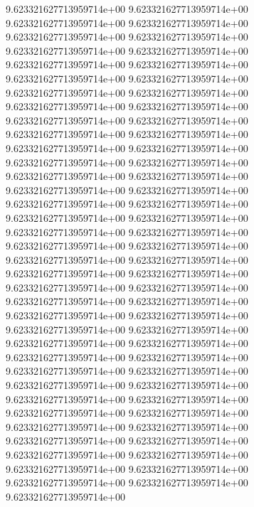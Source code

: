 9.623321627713959714e+00	9.623321627713959714e+00	9.623321627713959714e+00	9.623321627713959714e+00	9.623321627713959714e+00	9.623321627713959714e+00	9.623321627713959714e+00	9.623321627713959714e+00	9.623321627713959714e+00	9.623321627713959714e+00	9.623321627713959714e+00	9.623321627713959714e+00	9.623321627713959714e+00	9.623321627713959714e+00	9.623321627713959714e+00	9.623321627713959714e+00	9.623321627713959714e+00	9.623321627713959714e+00	9.623321627713959714e+00	9.623321627713959714e+00	9.623321627713959714e+00	9.623321627713959714e+00	9.623321627713959714e+00	9.623321627713959714e+00	9.623321627713959714e+00	9.623321627713959714e+00	9.623321627713959714e+00	9.623321627713959714e+00	9.623321627713959714e+00	9.623321627713959714e+00	9.623321627713959714e+00	9.623321627713959714e+00	9.623321627713959714e+00	9.623321627713959714e+00	9.623321627713959714e+00	9.623321627713959714e+00	9.623321627713959714e+00	9.623321627713959714e+00	9.623321627713959714e+00	9.623321627713959714e+00	9.623321627713959714e+00	9.623321627713959714e+00	9.623321627713959714e+00	9.623321627713959714e+00	9.623321627713959714e+00	9.623321627713959714e+00	9.623321627713959714e+00	9.623321627713959714e+00	9.623321627713959714e+00	9.623321627713959714e+00	9.623321627713959714e+00	9.623321627713959714e+00	9.623321627713959714e+00	9.623321627713959714e+00	9.623321627713959714e+00	9.623321627713959714e+00	9.623321627713959714e+00	9.623321627713959714e+00	9.623321627713959714e+00	9.623321627713959714e+00	9.623321627713959714e+00	9.623321627713959714e+00	9.623321627713959714e+00	9.623321627713959714e+00	9.623321627713959714e+00	9.623321627713959714e+00	9.623321627713959714e+00	9.623321627713959714e+00	9.623321627713959714e+00	9.623321627713959714e+00	9.623321627713959714e+00
